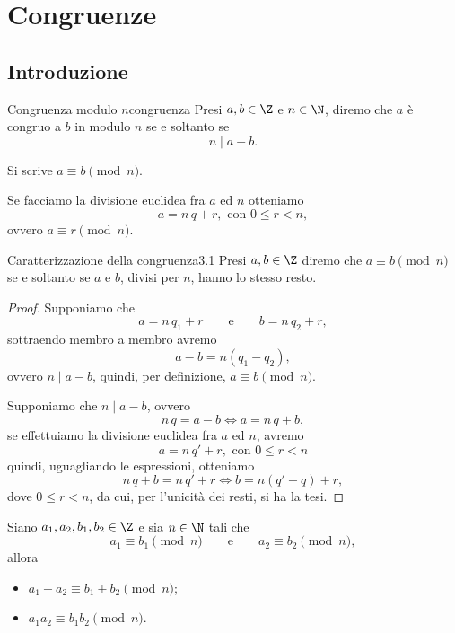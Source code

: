 %
%
\chapter{Congruenze}

\section{Introduzione}

\begin{defn}{Congruenza modulo \(n\)}{congruenza}
	Presi \(a,b\in\Z\) e \(n\in\N\), diremo che \(a\) è congruo a \(b\) in modulo \(n\) se e soltanto se
	\[
		n \mid a-b.
	\]
\end{defn}

\begin{notz}
	Si scrive \(a\equiv b \pmod{n}\).
\end{notz}

\begin{oss}
	Se facciamo la divisione euclidea fra \(a\) ed \(n\) otteniamo
	\[
		a = n\,q + r,\text{ con }0\le r < n,
	\]
	ovvero \(a\equiv r \pmod{n}\).
\end{oss}

\begin{teor}{Caratterizzazione della congruenza}{3.1}
	Presi \(a,b\in\Z\) diremo che \(a\equiv b \pmod{n}\) se e soltanto se \(a\) e \(b\), divisi per \(n\), hanno lo stesso resto.
\end{teor}

\begin{proof}
	\graffito{\(\Leftarrow)\)}Supponiamo che
	\[
		a = n\,q_1 + r \qquad\text{e}\qquad b = n\,q_2 + r,
	\]
	sottraendo membro a membro avremo
	\[
		a-b = n(q_1 - q_2),
	\]
	ovvero \(n\mid a-b\), quindi, per definizione, \(a\equiv b \pmod{n}\).

	\graffito{\(\Rightarrow)\)}Supponiamo che \(n\mid a-b\), ovvero
	\[
		n\,q = a-b \iff a = n\,q + b,
	\]
	se effettuiamo la divisione euclidea fra \(a\) ed \(n\), avremo
	\[
		a = n\,q' + r,\text{ con }0\le r < n
	\]
	quindi, uguagliando le espressioni, otteniamo
	\[
		n\,q+b = n\,q'+r \iff b = n(q'-q) + r,
	\]
	dove \(0\le r < n\), da cui, per l'unicità dei resti, si ha la tesi.
\end{proof}

\begin{pr}\label{th:3.2}
	Siano \(a_1,a_2,b_1,b_2\in\Z\) e sia \(n\in\N\) tali che
	\[
		a_1\equiv b_1 \pmod{n}\qquad\text{e}\qquad a_2\equiv b_2 \pmod{n},
	\]
	allora
	\begin{itemize}
		\item \(a_1+a_2\equiv b_1+b_2 \pmod{n}\);
		\item \(a_1 a_2\equiv b_1 b_2 \pmod{n}\).
	\end{itemize}
\end{pr}

